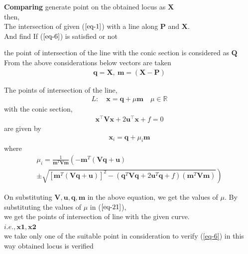 \documentclass[journal,10pt,twocolumn]{article}
\let\vec\mathbf
\let\vec\mathbf
\providecommand{\brak}[1]{\ensuremath{\left(#1\right)}}
\providecommand{\brak}[1]{\ensuremath{\left(#1\right)}}
\providecommand{\lbrak}[1]{\ensuremath{\left(#1\right.}}
\providecommand{\rbrak}[1]{\ensuremath{\left.#1\right)}}
\providecommand{\sbrak}[1]{\ensuremath{{}\left[#1\right]}}
\begin{document}
\textbf{Comparing }
generate point on the obtained locus as $\vec{X}$\\
then,\\ The intersection of given ($\ref{eq-1}$) with a line along $\vec{P}$ and $\vec{X}$. 
 \\And find If ($\ref{eq-6}$) is satisfied or not 

the point of intersection of the line with the conic section is considered as $\vec{Q}$
\\

From the above considerations below vectors are taken
\begin{align}
\vec{q} = \vec{X} ,\: \vec{m}=(\vec{X-P})
\end{align}


The points of intersection of the line, \\ 
\begin{align}
L: \quad \vec{x} = \vec{q} + \mu \vec{m} \quad \mu \in \mathbb{R}
\end{align}
with the conic section, \\ 
\begin{align}
	\vec{x}^{\top}\vec{V}\vec{x} + 2\vec{u}^{\top} \vec{x} + f = 0
\end{align}
are given by \\
\begin{align}
\vec{x}_i = \vec{q} + \mu_i \vec{m}
\label{eq-21}
\end{align}
where
{\tiny
\begin{multline}
\mu_i = \frac{1}
{
\vec{m}^T\vec{V}\vec{m}
}
\lbrak{-\vec{m}^T\brak{\vec{V}\vec{q}+\vec{u}}}
\\
\pm
\rbrak{\sqrt{
\sbrak{
\vec{m}^T\brak{\vec{V}\vec{q}+\vec{u}}
}^2
-
\brak
{
\vec{q}^T\vec{V}\vec{q} + 2\vec{u}^T\vec{q} +f
}
\brak{\vec{m}^T\vec{V}\vec{m}}
}
}
\label{eq-22}
\end{multline}
}

\raggedright On substituting $\vec{V},\vec{u},\vec{q} ,\vec{m}$ in the above
equation,
we get the values of $\mu$. By substituting the values of $\mu$ in
($\ref{eq-21}$), \\we get the points of intersection of line with the given
curve. \\
\centering $i.e., \vec{x1},\vec{x2}$\\  we take only one of the suitable point in consideration to verify (\ref{eq-6})
in this way obtained locus is verified
\end{document}
